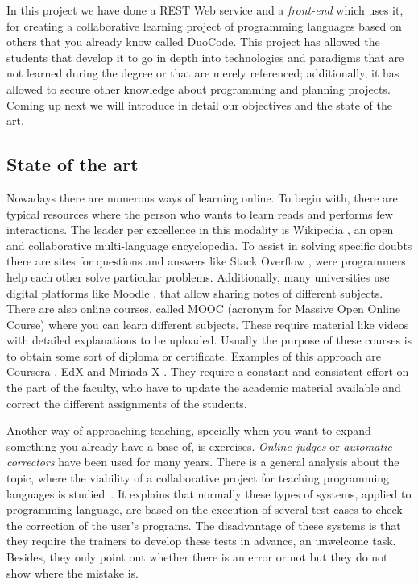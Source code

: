 
In this project we have done a REST Web service and a \emph{front-end} which uses it, for creating a collaborative learning project of programming languages based on others that you already know called DuoCode. This project has allowed the students that develop it to go in depth into technologies and paradigms that are not learned during the degree or that are merely referenced; additionally, it has allowed to secure other knowledge about programming and planning projects. Coming up next we will introduce in detail our objectives and the state of the art.

\subsection{State of the art\label{subsec:state_art}}

Nowadays there are numerous ways of learning online. To begin with, there are typical resources where the person who wants to learn reads and performs few interactions. The leader per excellence in this modality is Wikipedia \cite{wiki}, an open and collaborative multi-language encyclopedia. To assist in solving specific doubts there are sites for questions and answers like Stack Overflow \cite{stack}, were programmers help each other solve particular problems. Additionally, many universities use digital platforms like Moodle \cite{moodle}, that allow sharing notes of different subjects. There are also online courses, called MOOC (acronym for Massive Open Online Course) where you can learn different subjects. These require material like videos with detailed explanations to be uploaded. Usually the purpose of these courses is to obtain some sort of diploma or certificate. Examples of this approach are Coursera \cite{coursera}, EdX \cite{edX} and Miriada X \cite{miriadaX}. They require a constant and consistent effort on the part of the faculty, who have to update the academic material available and correct the different assignments of the students.

Another way of approaching teaching, specially when you want to expand something you already have a base of, is exercises. \emph{Online judges} or \emph{automatic correctors} have been used for many years. There is a general analysis about the topic, where the viability of a collaborative project for teaching programming languages is studied~\cite{pimcdDuoCode14}. It explains that normally these types of systems, applied to programming language, are based on the execution of several test cases to check the correction of the user's programs. The disadvantage of these systems is that they require the trainers to develop these tests in advance, an unwelcome task. Besides, they only point out whether there is an error or not but they do not show where the mistake is.


